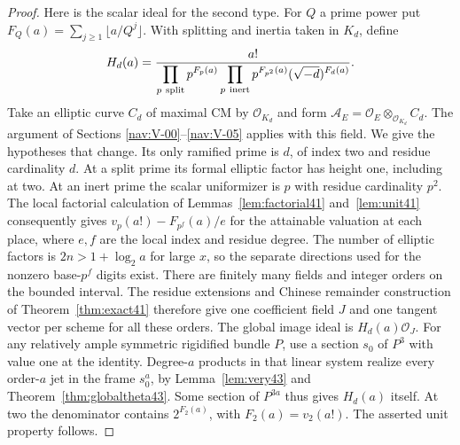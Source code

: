 \documentclass[a4paper,11pt]{article}
\theoremstyle{definition}
\theoremstyle{remark}
\numberwithin{equation}{section}
\begin{document}
\begin{proof}
Here is the scalar ideal for the second type. For \(Q\) a prime power put
\(F_Q(a)=\sum_{j\ge1}\lfloor a/Q^j\rfloor\). With splitting and
inertia taken in \(K_d\), define
\[
 H_d(a)=
 \frac{a!}{\displaystyle
   \prod_{p\ {\rm split}}p^{F_p(a)}
   \prod_{p\ {\rm inert}}p^{F_{p^2}(a)}
   (\sqrt{-d})^{F_d(a)}} .
\]
Take an elliptic curve \(C_d\) of maximal CM by \(\mathcal O_{K_d}\)
and form \(\mathcal A_E=\mathcal O_E\otimes_{\mathcal O_{K_d}}C_d\).
The argument of Sections \ref{nav:V-00}--\ref{nav:V-05} applies with this field. We give the hypotheses that
change. Its only ramified prime is \(d\), of index two and residue
cardinality \(d\). At a split prime its formal elliptic factor has height
one, including at two. At an inert prime the scalar uniformizer is \(p\)
with residue cardinality \(p^2\). The local factorial calculation of
Lemmas~\ref{lem:factorial41} and~\ref{lem:unit41} consequently gives
\(v_p(a!)-F_{p^f}(a)/e\) for the attainable valuation at each place,
where \(e,f\) are the local index and residue degree. The number of
elliptic factors is \(2n>1+\log_2 a\) for large \(x\), so the separate
directions used for the nonzero base-\(p^f\) digits exist. There are
finitely many fields and integer orders on the bounded interval. The
residue extensions and Chinese remainder construction of Theorem~\ref{thm:exact41}
therefore give one coefficient field \(J\) and one tangent vector per
scheme for all these orders. The global image ideal is \(H_d(a)\mathcal O_J\).
For any relatively ample symmetric rigidified bundle \(P\), use a
section \(s_0\) of \(P^3\) with value one at the identity. Degree-\(a\)
products in that linear system realize every order-\(a\) jet in the
frame \(s_0^a\), by Lemma~\ref{lem:very43} and Theorem~\ref{thm:globaltheta43}. Some
section of \(P^{3a}\) thus gives \(H_d(a)\) itself. At two the denominator
contains \(2^{F_2(a)}\), with \(F_2(a)=v_2(a!)\). The asserted unit
property follows.
\end{proof}
\end{document}
